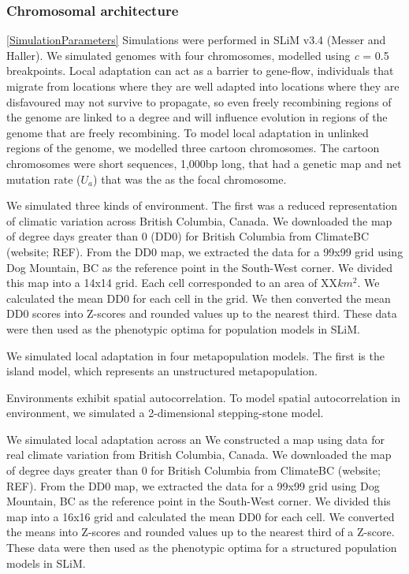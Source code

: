 \documentclass[11pt,twoside,lineno]{GSA_format}
\begin{document}
\subsubsection{Chromosomal architecture}

\ref{SimulationParameters}
Simulations were performed in SLiM v3.4 (Messer and Haller). 
We simulated genomes with four chromosomes, modelled using \textit{c} = 0.5 breakpoints. 
Local adaptation can act as a barrier to gene-flow, individuals that migrate from locations where they are well adapted into locations where they are disfavoured may not survive to propagate, so even freely recombining regions of the genome are linked to a degree and will influence evolution in regions of the genome that are freely recombining. To model local adaptation in unlinked regions of the genome, we modelled three cartoon chromosomes. The cartoon chromosomes were short sequences, 1,000bp long, that had a genetic map and net mutation rate (\textit{$U_a$}) that was the as the focal chromosome. 

We simulated three kinds of environment. The first was a reduced representation of climatic variation across British Columbia, Canada. We downloaded the map of degree days greater than 0 (DD0) for British Columbia from ClimateBC (website; REF). From the DD0 map, we extracted the data for a 99x99 grid using Dog Mountain, BC as the reference point in the South-West corner. We divided this map into a 14x14 grid. Each cell corresponded to an area of XX$km^2$. We calculated the mean DD0 for each cell in the grid. We then converted the mean DD0 scores into Z-scores and rounded values up to the nearest third. These data were then used as the phenotypic optima for population models in SLiM.

We simulated local adaptation in four metapopulation models. The first is the island model, which represents an unstructured metapopulation. 

Environments exhibit spatial autocorrelation. To model spatial autocorrelation in environment, we simulated a 2-dimensional stepping-stone model. 

We simulated local adaptation across an 
We constructed a map using data for real climate variation from British Columbia, Canada. We downloaded the map of degree days greater than 0 for British Columbia from ClimateBC (website; REF). From the DD0 map, we extracted the data for a 99x99 grid using Dog Mountain, BC as the reference point in the South-West corner. We divided this map into a 16x16 grid and calculated the mean DD0 for each cell. We converted the means into Z-scores and rounded values up to the nearest third of a Z-score. These data were then used as the phenotypic optima for a structured population models in SLiM.
\end{document}
